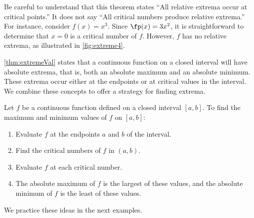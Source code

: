 Be careful to understand that this theorem states  ``All relative extrema occur at critical points.'' It does not say ``All critical numbers produce relative extrema.'' For instance, consider $f(x) = x^3$. Since $\fp(x) = 3x^2$, it is straightforward to determine that $x=0$ is a critical number of $f$. However, $f$ has no relative extrema, as illustrated in \autoref{fig:extreme4}.\bigskip

\autoref{thm:extremeVal} states that a continuous function on a closed interval will have absolute extrema, that is, both an absolute maximum and an absolute minimum. These extrema occur either at the endpoints or at critical values in the interval. We combine these concepts to offer a strategy for finding extrema.

%
{Let $f$ be a continuous function defined on a closed interval $[a,b]$. To find the maximum and minimum values of $f$ on $[a,b]$:
	\begin{enumerate}
	\item		Evaluate $f$ at the endpoints $a$ and $b$ of the interval.
	\item		Find the critical numbers of $f$ in $(a,b)$.
	\item		Evaluate $f$ at each critical number.
	\item		The absolute maximum of $f$ is the largest of these values, and the absolute minimum of $f$ is the least of these values.
	\end{enumerate}}

We practice these ideas in the next examples.

